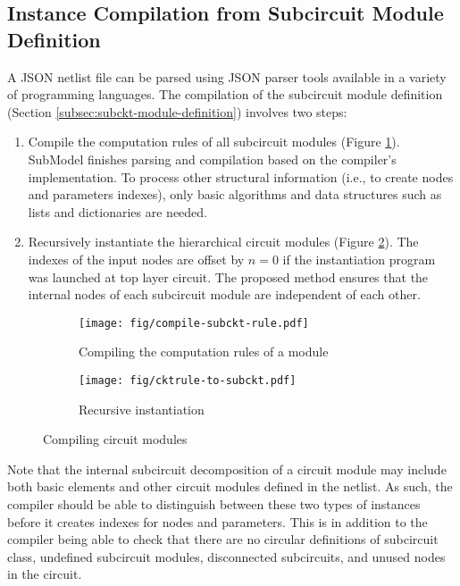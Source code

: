 \subsection{Instance Compilation from Subcircuit Module Definition}
\label{subsec:subckt-module-compilation}
A JSON netlist file can be parsed using JSON parser tools available in a variety of programming languages. The compilation of the subcircuit module definition (Section \ref{subsec:subckt-module-definition}) involves two steps:
\begin{enumerate}[partopsep=0pt,topsep=0pt,itemsep=0pt,parsep=0pt]
  \item Compile the computation rules of all subcircuit modules (Figure \ref{fig:compile-subckt-rule}). SubModel finishes parsing and compilation based on the compiler's implementation. To process other structural information (i.e., to create nodes and parameters indexes), only basic algorithms and data structures such as lists and dictionaries are needed.
\item Recursively instantiate the hierarchical circuit modules (Figure \ref{fig:cktrule-to-subckt}).
  The indexes of the input nodes are offset by $n=0$ if the instantiation program was launched at top layer circuit. The proposed method ensures that the internal nodes of each subcircuit module are independent of each other.
\end{enumerate}
\begin{figure}[htpb]
\centering
\begin{subfigure}{0.59\textwidth}
	\texttt{[image: fig/compile-subckt-rule.pdf]}
	\caption{Compiling the computation rules of a module}
	\label{fig:compile-subckt-rule}
\end{subfigure}
\begin{subfigure}{0.35\textwidth}
	\texttt{[image: fig/cktrule-to-subckt.pdf]}
	\caption{Recursive instantiation}
	\label{fig:cktrule-to-subckt}
\end{subfigure}
\caption{Compiling circuit modules}
\label{fig:subckt-module-compilation}
\end{figure}
Note that the internal subcircuit decomposition of a circuit module may include both basic elements and other circuit modules defined in the netlist. As such, the compiler should be able to distinguish between these two types of instances before it creates indexes for nodes and parameters. This is in addition to the compiler being able to check that there are no circular definitions of subcircuit class, undefined subcircuit modules, disconnected subcircuits, and unused nodes in the circuit.
